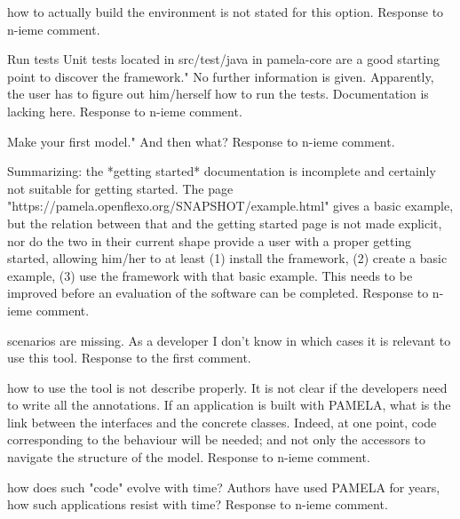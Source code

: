 \documentclass[10pt]{article}
\begin{document}
\begin{response}{how to actually build the environment is not stated for this option.}
  Response to n-ieme comment.
\end{response}

\begin{response}{Run tests Unit tests located in src/test/java in pamela-core are a good starting point to discover the framework." No further information is given. Apparently, the user has to figure out him/herself how to run the tests. Documentation is lacking here.
}
  Response to n-ieme comment.
\end{response}

\begin{response}{Make your first model." And then what?
}
  Response to n-ieme comment.
\end{response}

\begin{response}{Summarizing: the *getting started* documentation is incomplete and certainly not suitable for getting started. The page "https://pamela.openflexo.org/SNAPSHOT/example.html" gives a basic example, but the relation between that and the getting started page is not made explicit, nor do the two in their current shape provide a user with a proper getting started, allowing him/her to at least (1) install the framework, (2) create a basic example, (3) use the framework with that basic example. This needs to be improved before an evaluation of the software can be completed.
}
  Response to n-ieme comment.
\end{response}


\pagebreak

\begin{response}{scenarios are missing. As a developer I don't know in which cases it is relevant to use this tool.}
  Response to the first comment.
\end{response}


\begin{response}{how to use the tool is not describe properly. It is not clear if the developers need to write all the annotations. If an application is built with PAMELA, what is the link between the interfaces and the concrete classes. Indeed, at one point, code corresponding to the behaviour will be needed; and not only the accessors to navigate the structure of the model.}
  Response to n-ieme comment.
\end{response}

\begin{response}{how does such "code" evolve with time? Authors have used PAMELA for years, how such applications resist with time?}
  Response to n-ieme comment.
\end{response}
\end{document}
